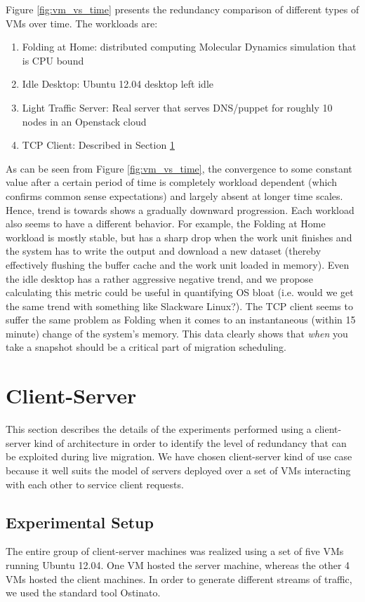\documentclass{acm_proc_article-sp}
\begin{document}
Figure \ref{fig:vm_vs_time} presents the redundancy comparison of different types of VMs over time.  The workloads are:
\begin{enumerate}
  \item Folding at Home: distributed computing Molecular Dynamics simulation that is CPU bound
  \item Idle Desktop: Ubuntu 12.04 desktop left idle
  \item Light Traffic Server: Real server that serves DNS/puppet for roughly 10 nodes in an Openstack cloud
  \item TCP Client: Described in Section \ref{sec:client-server}
\end{enumerate}

As can be seen from Figure \ref{fig:vm_vs_time}, the convergence to some constant value after a certain period of time is completely workload dependent (which confirms common sense expectations) and largely absent at longer time scales.  Hence, trend is towards shows a gradually downward progression. Each workload also seems to have a different behavior.  For example, the Folding at Home workload is mostly stable, but has a sharp drop when the work unit finishes and the system has to write the output and download a new dataset (thereby effectively flushing the buffer cache and the work unit loaded in memory).  Even the idle desktop has a rather aggressive negative trend, and we propose calculating this metric could be useful in quantifying OS bloat (i.e. would we get the same trend with something like Slackware Linux?).  The TCP client seems to suffer the same problem as Folding when it comes to an instantaneous (within 15 minute) change of the system's memory.  This data clearly shows that \textit{when} you take a snapshot should be a critical part of migration scheduling.

\section{Client-Server}\label{sec:client-server}
This section describes the details of the experiments performed using a client-server kind of architecture in order to identify the level of redundancy that can be exploited during live migration. We have chosen client-server kind of use case because it well suits the model of servers deployed over a set of VMs interacting with each other to service client requests.

\subsection{Experimental Setup}
The entire group of client-server machines was realized using a set of five VMs running Ubuntu 12.04. One VM hosted the server machine, whereas the other 4 VMs hosted the client machines. In order to generate different streams of traffic, we used the standard tool Ostinato.
\end{document}
